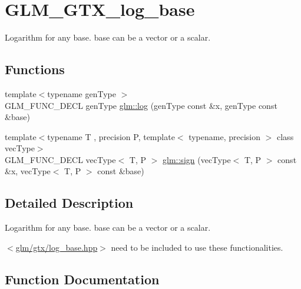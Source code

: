 \hypertarget{group__gtx__log__base}{}\section{G\+L\+M\+\_\+\+G\+T\+X\+\_\+log\+\_\+base}
\label{group__gtx__log__base}


Logarithm for any base. base can be a vector or a scalar.  


\subsection*{Functions}
\begin{DoxyCompactItemize}
\item 
{\footnotesize template$<$typename gen\+Type $>$ }\\G\+L\+M\+\_\+\+F\+U\+N\+C\+\_\+\+D\+E\+CL gen\+Type \hyperlink{group__gtx__log__base_ga60a7b0a401da660869946b2b77c710c9}{glm\+::log} (gen\+Type const \&x, gen\+Type const \&base)
\item 
{\footnotesize template$<$typename T , precision P, template$<$ typename, precision $>$ class vec\+Type$>$ }\\G\+L\+M\+\_\+\+F\+U\+N\+C\+\_\+\+D\+E\+CL vec\+Type$<$ T, P $>$ \hyperlink{group__gtx__log__base_ga1842004a127a9f3573764362ff639191}{glm\+::sign} (vec\+Type$<$ T, P $>$ const \&x, vec\+Type$<$ T, P $>$ const \&base)
\end{DoxyCompactItemize}


\subsection{Detailed Description}
Logarithm for any base. base can be a vector or a scalar. 

$<$\hyperlink{log__base_8hpp}{glm/gtx/log\+\_\+base.\+hpp}$>$ need to be included to use these functionalities. 

\subsection{Function Documentation}
\mbox{\label{group__gtx__log__base_ga60a7b0a401da660869946b2b77c710c9}} 

